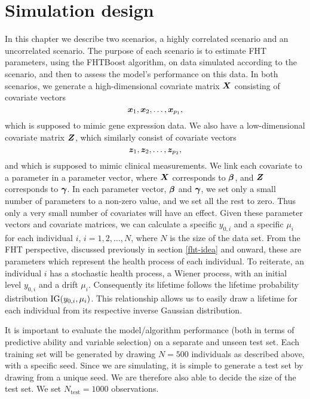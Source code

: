 \section{Simulation design}
In this chapter we describe two scenarios, a highly correlated scenario and an uncorrelated scenario. 
The purpose of each scenario is to estimate FHT parameters, using the FHTBoost algorithm, on data simulated according to the scenario, and then to assess the model's performance on this data.
In both scenarios, we generate a high-dimensional covariate matrix $\bm{X}$ consisting of covariate vectors
\begin{equation}
    \bm{x}_1,\bm{x}_2,\ldots,\bm{x}_{p_1},
\end{equation}
which is supposed to mimic gene expression data.
We also have a low-dimensional covariate matrix $\bm{Z}$, which similarly consist of covariate vectors
\begin{equation}
    \bm{z}_1,\bm{z}_2,\ldots,\bm{z}_{p_2},
\end{equation}
and which is supposed to mimic clinical measurements.
We link each covariate to a parameter in a parameter vector, where $\bm{X}$ corresponds to $\boldsymbol{\beta}$, and $\bm{Z}$ corresponds to $\boldsymbol{\gamma}$.
In each parameter vector, $\boldsymbol{\beta}$ and $\boldsymbol{\gamma}$, we set only a small number of parameters to a non-zero value, and we set all the rest to zero.
Thus only a very small number of covariates will have an effect.
Given these parameter vectors and covariate matrices, we can calculate a specific $y_{0,i}$ and a specific $\mu_i$ for each individual $i$, $i=1,2,\ldots,N$, where $N$ is the size of the data set.
From the FHT perspective, discussed previously in section \ref{fht-idea} and onward, these are parameters which represent the health process of each individual.
To reiterate, an individual $i$ has a stochastic health process, a Wiener process, with an initial level $y_{0,i}$ and a drift $\mu_i$.
Consequently its lifetime follows the lifetime probability distribution $\operatorname{IG}(y_{0,i},\mu_i)$.
This relationship allows us to easily draw a lifetime for each individual from its respective inverse Gaussian distribution.

It is important to evaluate the model/algorithm performance (both in terms of predictive ability and variable selection) on a separate and unseen test set.
Each training set will be generated by drawing $N=500$ individuals as described above, with a specific seed.
Since we are simulating, it is simple to generate a test set by drawing from a unique seed.
We are therefore also able to decide the size of the test set.
We set $N_{\text{test}}=1000$ observations.


